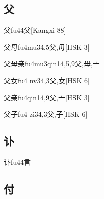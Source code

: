 \subsection*{父}

\begin{EntryWithPhonetic}{父}{fu4}{4}{⽗}[Kangxi 88]
\end{EntryWithPhonetic}

\begin{EntryWithPhonetic}{父母}{fu4mu3}{4,5}{⽗,⽏}[HSK 3]
\end{EntryWithPhonetic}

\begin{EntryWithPhonetic}{父母亲}{fu4mu3qin1}{4,5,9}{⽗,⽏,⼇}
\end{EntryWithPhonetic}

\begin{EntryWithPhonetic}{父女}{fu4 nv3}{4,3}{⽗,⼥}[HSK 6]
\end{EntryWithPhonetic}

\begin{EntryWithPhonetic}{父亲}{fu4qin1}{4,9}{⽗,⼇}[HSK 3]
\end{EntryWithPhonetic}

\begin{EntryWithPhonetic}{父子}{fu4 zi3}{4,3}{⽗,⼦}[HSK 6]
\end{EntryWithPhonetic}

\subsection*{讣}

\begin{EntryWithPhonetic}{讣}{fu4}{4}{⾔}
\end{EntryWithPhonetic}

\subsection*{付}

